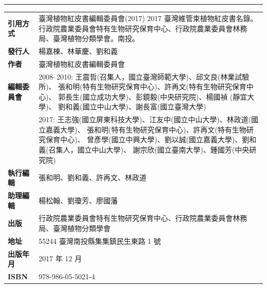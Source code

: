 \clearpage
\pagestyle{plain}
\thispagestyle{empty}
\linespread{1.5}
\noindent\huge \color{red}{2017 臺灣維管束植物紅皮書名錄} \\
\noindent\Large \color{red}{The Red List of Vascular Plants of Taiwan, 2017} \\
\normalsize
\hrule
\color{black}
\begin{table}[H]
  \scriptsize
  {\renewcommand\arraystretch{1.2}
  \begin{tabular}{>{\raggedleft\arraybackslash}p{2.5cm}p{9cm}}
      \textbf{引用方式}          & 臺灣植物紅皮書編輯委員會(2017) 
                                        2017 臺灣維管束植物紅皮書名錄。
                                        行政院農業委員會特有生物研究保育中心、行政院農業委員會林務局、臺灣植物分類學會。南投。\\
      \textbf{發行人}                 & 楊嘉棟、林華慶、劉和義 \\
      \textbf{作者}                   & 臺灣植物紅皮書編輯委員會 \\
      \textbf{編輯委員會}             & 2008--2010: 王震哲(召集人，國立臺灣師範大學)、邱文良(林業試驗所)、
                                        張和明(特有生物研究保育中心)、許再文(特有生物研究保育中心)、
                                        郭長生(國立成功大學)、彭鏡毅(中央研究院)、楊國禎 (靜宜大學)、
                                        劉和義(國立中山大學)、謝長富(國立臺灣大學) \\
                                      & 2017: 王志強(國立屏東科技大學)、江友中(國立中山大學)、林政道(國立嘉義大學)、
                                        張和明(特有生物研究保育中心)、許再文(特有生物研究保育中心)、
                                        曾彥學(國立中興大學)、劉以誠(國立嘉義大學)、劉和義(召集人，國立中山大學)、
                                        謝宗欣(國立臺南大學)、鍾國芳(中央研究院) \\
      \textbf{執行編輯}          & 張和明、劉和義、許再文、林政道 \\
      \textbf{助理編輯}          & 楊松翰、劉瓊芳、廖國藩 \\
      \textbf{出版}              & 行政院農業委員會特有生物研究保育中心、行政院農業委員會林務局、臺灣植物分類學會 \\
      \textbf{地址}              & 55244 臺灣南投縣集集鎮民生東路 1 號 \\
      \textbf{出版年月}          & 2017 年 12 月 \\
      \textbf{ISBN}              & 978-986-05-5021-4 \\

\end{tabular}}
\end{table}
